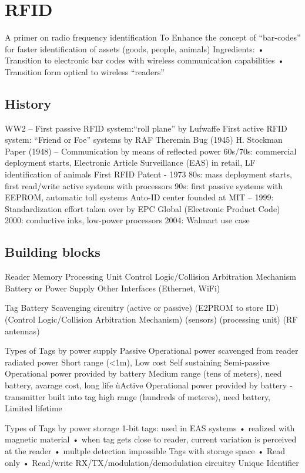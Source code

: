 \section{RFID}

A primer on radio frequency identification
To Enhance the concept of “bar-codes” for faster identification of assets
(goods, people, animals)
Ingredients:
• Transition to electronic bar codes with wireless communication
capabilities
• Transition form optical to wireless “readers”

\subsection{History}
WW2 –
First passive RFID system:“roll plane” by Lufwaffe
First active RFID system: “Friend or Foe” systems by RAF
Theremin Bug (1945)
H. Stockman Paper (1948) – Communication by means of reflected power
60s/70s: commercial deployment starts, Electronic Article Surveillance
(EAS) in retail, LF identification of animals
First RFID Patent - 1973
80s: mass deployment starts, first read/write active systems with
processors
90s: first passive systems with EEPROM, automatic toll systems
Auto-ID center founded at MIT – 1999: Standardization effort taken over
by EPC Global (Electronic Product Code)
2000: conductive inks, low-power processors
2004: Walmart use case

\subsection{Building blocks}
Reader 
Memory
Processing Unit
Control Logic/Collision Arbitration
Mechanism
Battery or Power Supply
Other Interfaces (Ethernet, WiFi)

Tag
Battery Scavenging circuitry
(active or passive)
(E2PROM to store ID)
(Control Logic/Collision
Arbitration Mechanism)
(sensors)
(processing unit)
(RF antennas)

Types of Tags by power supply
Passive
Operational power scavenged from
reader radiated power Short range (<1m), Low cost
Self sustaining
Semi-passive
Operational power provided by battery Medium range (tens of meters),
need battery, avarage cost,
long life
ùActive
Operational power provided by battery -
transmitter built into tag high range (hundreds of
meteres), need battery, Limited
lifetime

Types of Tags by power storage
1-bit tags: used in EAS systems
• realized with magnetic material
• when tag gets close to reader, current variation is
perceived at the reader
• multple detection impossible
Tags with storage space
• Read only
• Read/write
RX/TX/modulation/demodulation circuitry
Unique Identifier

